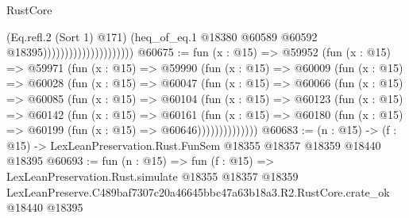 \begin{lexlean}{RustCore}
\begin{coremodule}
                                            (Eq.refl.{2} (Sort 1) @171)
                                            (heq_of_eq.{1}
                                              @18380
                                              @60589
                                              @60592
                                              @18395)))))))))))))))))))))
@60675 := fun (x : @15) =>
  @59952
    (fun (x : @15) =>
    @59971
      (fun (x : @15) =>
      @59990
        (fun (x : @15) =>
        @60009
          (fun (x : @15) =>
          @60028
            (fun (x : @15) =>
            @60047
              (fun (x : @15) =>
              @60066
                (fun (x : @15) =>
                @60085
                  (fun (x : @15) =>
                  @60104
                    (fun (x : @15) =>
                    @60123
                      (fun (x : @15) =>
                      @60142
                        (fun (x : @15) =>
                        @60161
                          (fun (x : @15) =>
                          @60180 (fun (x : @15) => @60199 (fun (x : @15) => @60646))))))))))))))
@60683 := (n : @15) ->
  (f : @15) -> LexLeanPreservation.Rust.FunSem @18355 @18357 @18359 @18440 @18395
@60693 := fun (n : @15) =>
  fun (f : @15) =>
  LexLeanPreservation.Rust.simulate
    @18355
    @18357
    @18359
    LexLeanPreserve.C489baf7307c20a46645bbc47a63b18a3.R2.RustCore.crate_ok
    @18440
    @18395
\end{coremodule}
\end{lexlean}
